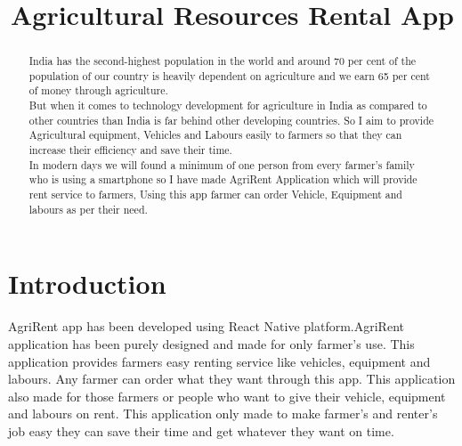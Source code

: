 \documentclass[conference]{IEEEtran}
\begin{document}
\title{Agricultural Resources Rental App\\
{\footnotesize \textsuperscript{}}
}

\author{
}

\maketitle

\begin{abstract}
 India has the second-highest population in the world and around 70 per cent of the population of our country is heavily dependent on agriculture and we earn 65 per cent of money through agriculture.\\
 But when it comes to technology development for agriculture in India as compared to other countries than India is far behind other developing countries. So I aim to provide Agricultural equipment, Vehicles and Labours easily to farmers so that they can increase their efficiency and save their time.\\
 In modern days we will found a minimum of one person from every farmer's family who is using a smartphone so I have made AgriRent Application which will provide rent service to farmers, Using this app farmer can order Vehicle, Equipment and labours as per their need.
\end{abstract}

\section{Introduction}
AgriRent app has been developed using React Native platform.AgriRent application has been purely designed and made for only farmer's use. This application provides farmers easy renting service like vehicles, equipment and labours. Any farmer can order what they want through this app. This application also made for those farmers or people who want to give their vehicle, equipment and labours on rent. This application only made to make farmer's and renter's job easy they can save their time and get whatever they want on time.
\end{document}
